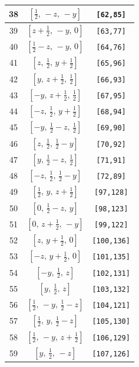 \documentclass[fleqn,8pt]{jsarticle}
\begin{document}
\begin{longtable}{ccc}
38 & $\left[ \frac{1}{2},\, - z,\, - y \right]$ & {\tt [62,85]} \\ \hline
39 & $\left[ z + \frac{1}{2},\, - y,\, 0 \right]$ & {\tt [63,77]} \\ \hline
40 & $\left[ \frac{1}{2} - z,\, - y,\, 0 \right]$ & {\tt [64,76]} \\ \hline
41 & $\left[ z,\, \frac{1}{2},\, y + \frac{1}{2} \right]$ & {\tt [65,96]} \\ \hline
42 & $\left[ y,\, z + \frac{1}{2},\, \frac{1}{2} \right]$ & {\tt [66,93]} \\ \hline
43 & $\left[ - y,\, z + \frac{1}{2},\, \frac{1}{2} \right]$ & {\tt [67,95]} \\ \hline
44 & $\left[ - z,\, \frac{1}{2},\, y + \frac{1}{2} \right]$ & {\tt [68,94]} \\ \hline
45 & $\left[ - y,\, \frac{1}{2} - z,\, \frac{1}{2} \right]$ & {\tt [69,90]} \\ \hline
46 & $\left[ z,\, \frac{1}{2},\, \frac{1}{2} - y \right]$ & {\tt [70,92]} \\ \hline
47 & $\left[ y,\, \frac{1}{2} - z,\, \frac{1}{2} \right]$ & {\tt [71,91]} \\ \hline
48 & $\left[ - z,\, \frac{1}{2},\, \frac{1}{2} - y \right]$ & {\tt [72,89]} \\ \hline
49 & $\left[ \frac{1}{2},\, y,\, z + \frac{1}{2} \right]$ & {\tt [97,128]} \\ \hline
50 & $\left[ 0,\, \frac{1}{2} - z,\, y \right]$ & {\tt [98,123]} \\ \hline
51 & $\left[ 0,\, z + \frac{1}{2},\, - y \right]$ & {\tt [99,122]} \\ \hline
52 & $\left[ z,\, y + \frac{1}{2},\, 0 \right]$ & {\tt [100,136]} \\ \hline
53 & $\left[ - z,\, y + \frac{1}{2},\, 0 \right]$ & {\tt [101,135]} \\ \hline
54 & $\left[ - y,\, \frac{1}{2},\, z \right]$ & {\tt [102,131]} \\ \hline
55 & $\left[ y,\, \frac{1}{2},\, z \right]$ & {\tt [103,132]} \\ \hline
56 & $\left[ \frac{1}{2},\, - y,\, \frac{1}{2} - z \right]$ & {\tt [104,121]} \\ \hline
57 & $\left[ \frac{1}{2},\, y,\, \frac{1}{2} - z \right]$ & {\tt [105,130]} \\ \hline
58 & $\left[ \frac{1}{2},\, - y,\, z + \frac{1}{2} \right]$ & {\tt [106,129]} \\ \hline
59 & $\left[ y,\, \frac{1}{2},\, - z \right]$ & {\tt [107,126]} \\ \hline

\end{longtable}
\end{document}

